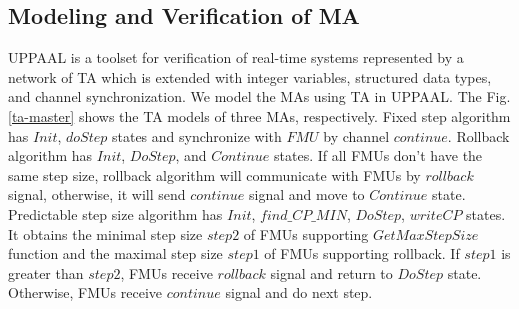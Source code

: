\subsection{Modeling and Verification of MA} 
UPPAAL is a toolset for verification of real-time systems represented by a network of TA which is extended with integer variables, structured data types, and channel synchronization. We model the MAs using TA in UPPAAL. The Fig.\ref{ta-master} shows the TA models of three MAs,  respectively. Fixed step algorithm has $Init$, $doStep$ states and synchronize with $FMU$ by channel $continue$. Rollback algorithm has $Init$, $DoStep$, and $Continue$ states. If all FMUs don't have the same step size, rollback algorithm will communicate with FMUs by $rollback$ signal, otherwise, it will send $continue$ signal and move to $Continue$ state. Predictable step size algorithm has $Init$, $find \_ CP \_ MIN$, $DoStep$, $writeCP$ states. It obtains the minimal step size $step2$ of FMUs supporting $GetMaxStepSize$ function and the maximal step size $step1$ of FMUs supporting rollback. If $step1$ is greater than $step2$, FMUs receive $rollback$ signal and return to $DoStep$ state. Otherwise, FMUs receive $continue$ signal and do next step.  

\begin{figure}[htbp]
\end{figure}

